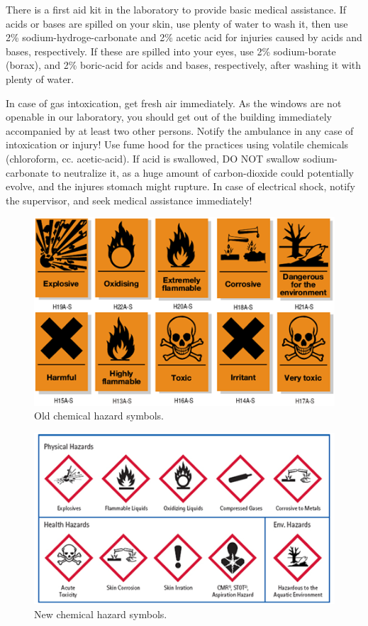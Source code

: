 There is a first aid kit in the laboratory to provide basic medical assistance. If acids or bases are spilled on your skin, use plenty of water to wash it, then use 2\% sodium-hydroge-carbonate and 2\% acetic acid for injuries caused by acids and bases, respectively. If these are spilled into your eyes, use 2\% sodium-borate (borax), and 2\% boric-acid for acids and bases, respectively, after washing it with plenty of water. 

In case of gas intoxication, get fresh air immediately. As the windows are not openable in our laboratory, you should get out of the building immediately accompanied by at least two other persons. Notify the ambulance in any case of intoxication or injury! Use fume hood for the practices using volatile chemicals (chloroform, cc. acetic-acid). If acid is swallowed, DO NOT swallow sodium-carbonate to neutralize it, as a huge amount of carbon-dioxide could potentially evolve, and the injures stomach might rupture. In case of electrical shock, notify the supervisor, and seek medical assistance immediately!


\begin{figure}
  \centering
  \includegraphics[width=1\textwidth]{fig/old_hazard.png}
  \caption{Old chemical hazard symbols.}
\end{figure}


\begin{figure}
  \centering
  \includegraphics[width=1\textwidth]{fig/new_hazard.png}
  \caption{New chemical hazard symbols.}
\end{figure}
